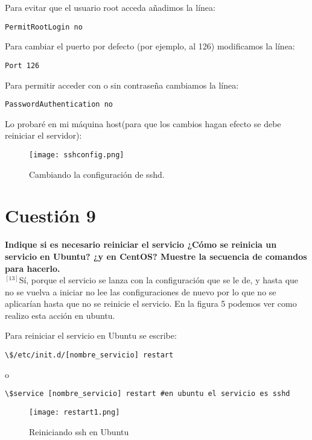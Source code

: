 \documentclass[a4paper, 11pt]{article} %
\begin{document}
Para evitar que el usuario root acceda añadimos la línea:
\begin{verbatim}
PermitRootLogin no
\end{verbatim}
Para cambiar el puerto por defecto (por ejemplo, al 126) modificamos la línea:
\begin{verbatim}
Port 126
\end{verbatim}
Para permitir acceder con o sin contraseña cambiamos la línea:
\begin{verbatim}
PasswordAuthentication no
\end{verbatim}
Lo probaré en mi máquina host(para que los cambios hagan efecto se debe reiniciar el servidor):

\begin{figure}[h]
\centering 
\texttt{[image: sshconfig.png]} 
\caption{Cambiando la configuración de sshd.} 
\vspace{-0.5cm}
\label{contexto:figura} 
\end{figure}

\pagebreak

\section{Cuestión 9}
\textbf{ Indique si es necesario reiniciar el servicio ¿Cómo se reinicia un servicio en Ubuntu? ¿y en CentOS? Muestre la secuencia de comandos para hacerlo.}\\

$^{[13]}$Sí, porque el servicio se lanza con la configuración que se le de, y hasta que no se vuelva a iniciar no lee las configuraciones de nuevo por lo que no se aplicarían hasta que no se reinicie el servicio. En la figura 5 podemos ver como realizo esta acción en ubuntu.

Para reiniciar el servicio en Ubuntu se escribe:
\begin{verbatim}
\$/etc/init.d/[nombre_servicio] restart
\end{verbatim}
o
\begin{verbatim}
\$service [nombre_servicio] restart #en ubuntu el servicio es sshd
\end{verbatim}

\begin{figure}[h]
\centering 
\texttt{[image: restart1.png]} 
\caption{Reiniciando ssh en Ubuntu} 
\vspace{-0.5cm}
\label{contexto:figura} 
\end{figure}
\end{document}
